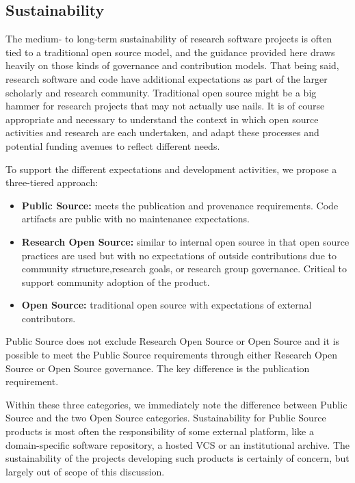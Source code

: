 \documentclass{article}
\begin{document}
\subsection{Sustainability}
The medium- to long-term sustainability of research software projects is often tied to a traditional open source model, and the guidance provided here draws heavily on those kinds of governance and contribution models. That being said, research software and code have additional expectations as part of the larger scholarly and research community. Traditional open source might be a big hammer for research projects that may not actually use nails. It is of course appropriate and necessary to understand the context in which open source activities and research are each undertaken, and adapt these processes and potential funding avenues to reflect different needs. 
 
To support the different expectations and development activities, we propose a three-tiered approach:
\begin{itemize}
\item \textbf{Public Source:} meets the publication and provenance requirements. Code artifacts are public with no maintenance expectations.
\item \textbf{Research Open Source:} similar to internal open source in that open source practices are used but with no expectations of outside contributions due to community structure,research goals, or research group governance. Critical to support community adoption of the product.
\item \textbf{Open Source:} traditional open source with expectations of external contributors.
\end{itemize}

Public Source does not exclude Research Open Source or Open Source and it is possible to meet the Public Source requirements through either Research Open Source or Open Source governance. The key difference is the publication requirement.
 
Within these three categories, we immediately note the difference between Public Source and the two Open Source categories. Sustainability for Public Source products is most often the responsibility of some external platform, like a domain-specific software repository, a hosted VCS or an institutional archive. The sustainability of the projects developing such products is certainly of concern, but largely out of scope of this discussion.
 
\end{document}
